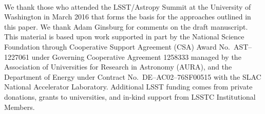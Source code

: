 \documentclass[]{spie}  %
\begin{document}
\acknowledgments\

We thank those who attended the LSST/Astropy Summit at the University of Washington in March 2016 that forms the basis for the approaches outlined in this paper.
We thank Adam Ginsburg for comments on the draft manuscript.
This material is based upon work supported in part by the National Science Foundation through Cooperative Support Agreement (CSA) Award No.\ AST--1227061 under Governing Cooperative Agreement 1258333 managed by the Association of Universities for Research in Astronomy (AURA), and the Department of Energy under Contract No.\ DE--AC02--76SF00515 with the SLAC National Accelerator Laboratory.
Additional LSST funding comes from private donations, grants to universities, and in-kind support from LSSTC Institutional Members.

\end{document}
